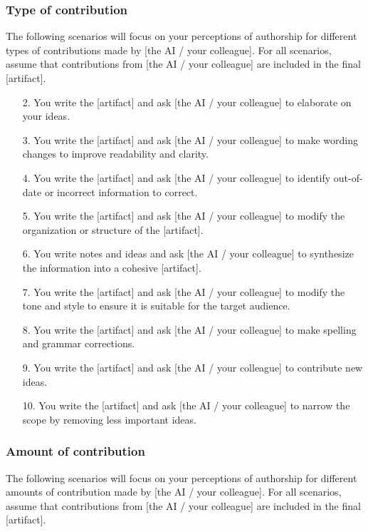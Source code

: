 \subsubsection{Type of contribution}
The following scenarios will focus on your perceptions of authorship for different types of contributions made by [the AI / your colleague]. For all scenarios, assume that contributions from [the AI / your colleague] are included in the final [artifact].
    
\begin{itemize}[leftmargin=0pt, itemindent=2em]
    \item[2.] You write the [artifact] and ask [the AI / your colleague] to elaborate on your ideas.
    \item[3.] You write the [artifact] and ask [the AI / your colleague] to make wording changes to improve readability and clarity.
    \item[4.] You write the [artifact] and ask [the AI / your colleague] to identify out-of-date or incorrect information to correct.
    \item[5.] You write the [artifact] and ask [the AI / your colleague] to modify the organization or structure of the [artifact].
    \item[6.] You write notes and ideas and ask [the AI / your colleague] to synthesize the information into a cohesive [artifact].
    \item[7.] You write the [artifact] and ask [the AI / your colleague] to modify the tone and style to ensure it is suitable for the target audience.
    \item[8.] You write the [artifact] and ask [the AI / your colleague] to make spelling and grammar corrections.
    \item[9.] You write the [artifact] and ask [the AI / your colleague] to contribute new ideas.
    \item[10.] You write the [artifact] and ask [the AI / your colleague] to narrow the scope by removing less important ideas.
\end{itemize}

\subsubsection{Amount of contribution}
The following scenarios will focus on your perceptions of authorship for different amounts of contribution made by [the AI / your colleague]. For all scenarios, assume that contributions from [the AI / your colleague] are included in the final [artifact].

